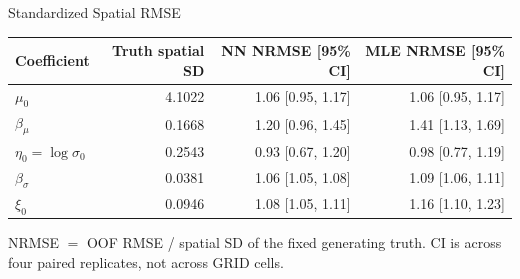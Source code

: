 \begin{frame}{Standardized Spatial RMSE}
\centering\small
\begin{tabular}{lrrr}
\toprule
Coefficient & Truth spatial SD & NN NRMSE [95\% CI] & MLE NRMSE [95\% CI] \\
\midrule
$\mu_0$ & 4.1022 & 1.06 [0.95, 1.17] & 1.06 [0.95, 1.17] \\
$\beta_\mu$ & 0.1668 & 1.20 [0.96, 1.45] & 1.41 [1.13, 1.69] \\
$\eta_0=\log\sigma_0$ & 0.2543 & 0.93 [0.67, 1.20] & 0.98 [0.77, 1.19] \\
$\beta_\sigma$ & 0.0381 & 1.06 [1.05, 1.08] & 1.09 [1.06, 1.11] \\
$\xi_0$ & 0.0946 & 1.08 [1.05, 1.11] & 1.16 [1.10, 1.23] \\
\bottomrule
\end{tabular}
\medskip
{\footnotesize NRMSE $=$ OOF RMSE / spatial SD of the fixed generating truth. CI is across four paired replicates, not across GRID cells.}
\end{frame}

